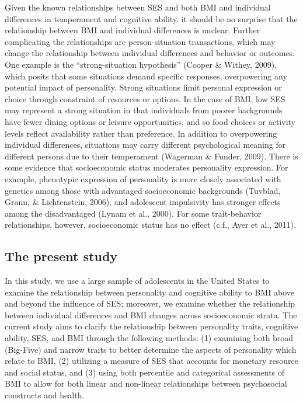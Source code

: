\documentclass[man]{apa6}
\begin{document}
Given the known relationships between SES and both BMI and individual differences in temperament and cognitive ability. it should be no surprise that the relationship between BMI and individual differences is unclear. Further complicating the relationships are person-situation transactions, which may change the relationship between individual differences and behavior or outcomes. One example is the \enquote{strong-situation hypothesis} (Cooper \& Withey, 2009), which posits that some situations demand specific responses, overpowering any potential impact of personality. Strong situations limit personal expression or choice through constraint of resources or options. In the case of BMI, low SES may represent a strong situation in that individuals from poorer backgrounds have fewer dining options or leisure opportunities, and so food choices or activity levels reflect availability rather than preference. In addition to overpowering individual differences, situations may carry different psychological meaning for different persons due to their temperament (Wagerman \& Funder, 2009). There is some evidence that socioeconomic status moderates personality expression. For example, phenotypic expression of personality is more closely associated with genetics among those with advantaged socioeconomic backgrounds (Tuvblad, Grann, \& Lichtenstein, 2006), and adolescent impulsivity has stronger effects among the disadvantaged (Lynam et al., 2000). For some trait-behavior relationships, however, socioeconomic status has no effect (c.f., Ayer et al., 2011).

\hypertarget{the-present-study}{%
\subsection{The present study}\label{the-present-study}}

In this study, we use a large sample of adolescents in the United States to examine the relationship between personality and cognitive ability to BMI above and beyond the influence of SES; moreover, we examine whether the relationship between individual differences and BMI changes across socioeconomic strata. The current study aims to clarify the relationship between personality traits, cognitive ability, SES, and BMI through the following methods: (1) examining both broad (Big-Five) and narrow traits to better determine the aspects of personality which relate to BMI, (2) utilizing a measure of SES that accounts for monetary resource and social status, and (3) using both percentile and categorical assessments of BMI to allow for both linear and non-linear relationships between psychosocial constructs and health.
\end{document}
